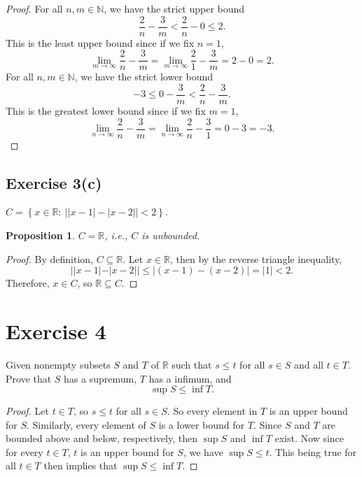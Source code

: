 \documentclass[12pt]{article}
\newtheorem{proposition}{Proposition}
\newenvironment{problem}
    {\begin{lrbox}{\mybox}\begin{minipage}{\textwidth-10pt}}
    {\end{minipage}\end{lrbox}\framebox[6.5in]{\usebox{\mybox}}}
\newcommand{\N}{\mathbb{N}}
\newcommand{\R}{\mathbb{R}}
\begin{document}
\begin{proof}
    For all $n,m\in\N$, we have the strict upper bound
    \[\frac2n-\frac3m < \frac2n-0 \leq 2.\]
    This is the least upper bound since if we fix $n=1$,
    \[\lim_{m\to\infty}\frac2n-\frac3m = \lim_{m\to\infty}\frac21-\frac3m = 2-0 = 2.\]
    For all $n,m\in\N$, we have the strict lower bound
    \[-3 \leq 0 - \frac3m < \frac2n - \frac3m.\]
    This is the greatest lower bound since if we fix $m=1$,
    \[\lim_{n\to\infty}\frac2n-\frac3m = \lim_{n\to\infty}\frac2n-\frac31 = 0-3 = -3.\]
    
\end{proof}

\subsection*{Exercise 3(c)}
\begin{problem}
    $C = \left \{ x \in \mathbb{R}:\ \Big | |x-1| - |x-2| \Big | < 2\right \}$.
\end{problem}

\begin{proposition}
    $C=\R$, i.e., $C$ is unbounded.
\end{proposition}

\begin{proof}
    By definition, $C\subseteq\R$. Let $x\in\R$, then by the reverse triangle inequality,
    \[||x-1|-|x-2|| \leq |(x-1)-(x-2)| = |1| < 2.\]
    Therefore, $x\in C$, so $\R\subseteq C$.
    
\end{proof}

\section*{Exercise 4}
\begin{problem}
    Given nonempty subsets $S$ and $T$ of $\mathbb{R}$ such that $s \le t$ for all $s\in S$ and all $t \in T$. Prove that $S$ has a supremum, $T$ has a infimum, and 
    \[
     \sup S \le \inf T.
    \]
\end{problem}

\begin{proof}
    Let $t\in T$, so $s\leq t$ for all $s\in S$. So every element in $T$ is an upper bound for $S$. Similarly, every element of $S$ is a lower bound for $T$. Since $S$ and $T$ are bounded above and below, respectively, then $\sup S$ and $\inf T$ exist. Now since for every $t\in T$, $t$ is an upper bound for $S$, we have $\sup S \leq t$. This being true for all $t\in T$ then implies that $\sup S \leq \inf T$.
    
\end{proof}
\end{document}
